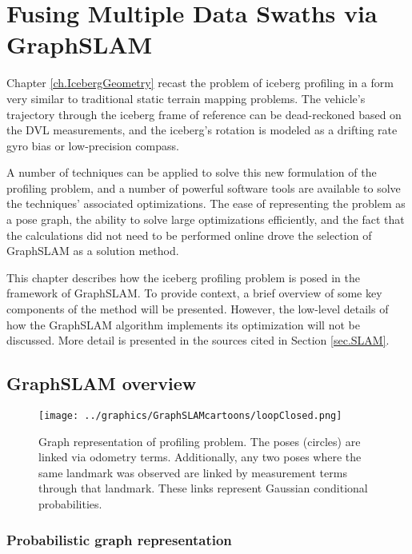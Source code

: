 
\chapter{Fusing Multiple Data Swaths via GraphSLAM}
\label{ch.GraphSLAM}

Chapter \ref{ch.IcebergGeometry} recast the problem of iceberg profiling in a form very similar to traditional static terrain mapping problems. The vehicle's trajectory through the iceberg frame of reference can be dead-reckoned based on the DVL measurements, and the iceberg's rotation is modeled as a drifting rate gyro bias or low-precision compass.

A number of techniques can be applied to solve this new formulation of the profiling problem, and a number of powerful software tools are available to solve the techniques' associated optimizations. The ease of representing the problem as a pose graph, the ability to solve large optimizations efficiently, and the fact that the calculations did not need to be performed online drove the selection of GraphSLAM as a solution method. 

This chapter describes how the iceberg profiling problem is posed in the framework of GraphSLAM. To provide context, a brief overview of some key components of the method will be presented. However, the low-level details of how the GraphSLAM algorithm implements its optimization will not be discussed. More detail is presented in the sources cited in Section \ref{sec.SLAM}.

\section{GraphSLAM overview}

\begin{figure}[htb]
   \centering
   \texttt{[image: ../graphics/GraphSLAMcartoons/loopClosed.png]} %
   \caption{Graph representation of profiling problem.  The poses (circles) are linked via odometry terms. Additionally, any two poses where the same landmark was observed are linked by measurement terms through that landmark. These links represent Gaussian conditional probabilities. }
   \label{fig:GraphSLAM}
\end{figure}

\subsection{Probabilistic graph representation}

